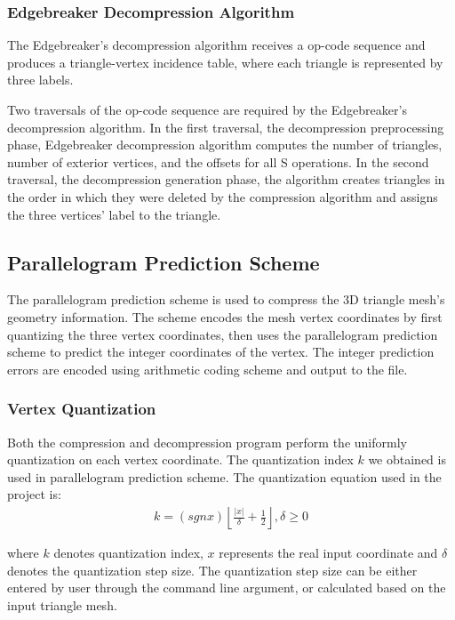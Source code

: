 \documentclass[onecolumn, 12pt]{article}
\begin{document}
\subsubsection{Edgebreaker Decompression Algorithm}
The Edgebreaker's decompression algorithm receives a op-code sequence and produces a triangle-vertex incidence table, where each triangle is represented by three labels.

Two traversals of the op-code sequence are required by the Edgebreaker's decompression algorithm. In the first traversal, the decompression preprocessing phase, Edgebreaker decompression algorithm computes the number of triangles, number of exterior vertices, and the offsets for all S operations. In the second traversal, the decompression generation phase, the algorithm creates triangles in the order in which they were deleted by the compression algorithm and assigns the three vertices' label to the triangle.


\subsection{Parallelogram Prediction Scheme}
The parallelogram prediction scheme is used to compress the 3D triangle mesh's geometry information. The scheme encodes the mesh vertex coordinates by first quantizing the three vertex coordinates, then uses the parallelogram prediction scheme to predict the integer coordinates of the vertex. The integer prediction errors are encoded using arithmetic coding scheme and output to the file.

\subsubsection{Vertex Quantization}
Both the compression and decompression program perform the uniformly quantization on each vertex coordinate. The quantization index $k$ we obtained is used in parallelogram prediction scheme. The quantization equation used in the project is:
\begin{align}\label{eq:qunatize}
k =  (sgnx) \left\lfloor{{\frac{\left|x\right|}{\delta}} + {\frac{1}{2}}}\right\rfloor,  \delta \geqslant 0
\end{align}

where $k$ denotes quantization index, $x$ represents the real input coordinate and $\delta$ denotes the quantization step size. The quantization step size can be either entered by user through the command line argument, or calculated based on the input triangle mesh.
\end{document}
